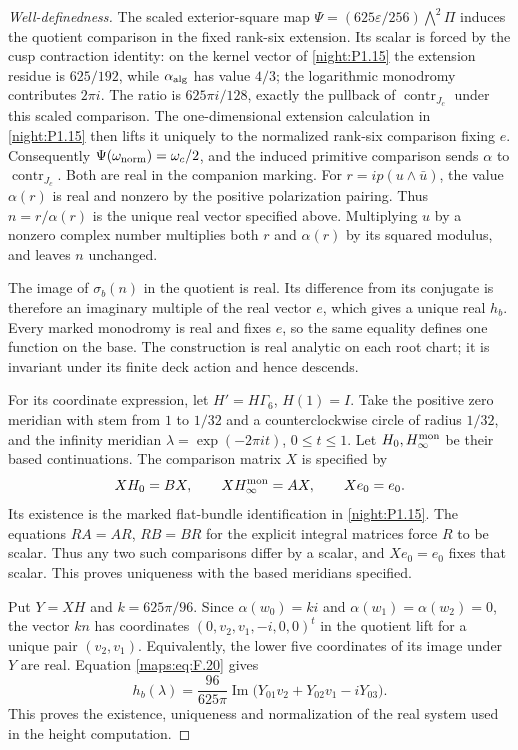 \begin{proof}[Well-definedness]
The scaled exterior-square map
$\Psi=(625\varepsilon/256)\bigwedge^2\Pi$ induces the
quotient comparison in the fixed rank-six extension. Its scalar is forced by the cusp contraction identity: on the
kernel vector of \cref{night:P1.15} the extension residue is
$625/192$, while $\alpha_{\rm alg}$ has value $4/3$; the
logarithmic monodromy contributes $2\pi i$. The ratio is
$625\pi i/128$, exactly the pullback of
$\operatorname{contr}_{J_c}$ under this scaled comparison.
The one-dimensional extension calculation in
\cref{night:P1.15} then lifts it uniquely to the normalized
rank-six comparison fixing $e$.
Consequently $\Psi(\omega_{\rm norm})=\omega_c/2$, and
the induced primitive comparison sends $\alpha$ to
$\operatorname{contr}_{J_c}$. Both are real in the companion
marking. For $r=ip(u\wedge\bar u)$, the value $\alpha(r)$
is real and nonzero by the positive polarization pairing.
Thus $n=r/\alpha(r)$ is the unique real vector specified above.
Multiplying $u$ by a nonzero complex number multiplies both
$r$ and $\alpha(r)$ by its squared modulus, and leaves $n$
unchanged.

The image of $\sigma_b(n)$ in the quotient is real. Its
difference from its conjugate is therefore an imaginary
multiple of the real vector $e$, which gives a unique real
$h_b$. Every marked monodromy is real and fixes $e$, so the
same equality defines one function on the base. The construction
is real analytic on each root chart; it is invariant under its
finite deck action and hence descends.

For its coordinate expression, let $H'=H\Gamma_6$, $H(1)=I$.
Take the positive zero meridian with stem from $1$ to $1/32$
and a counterclockwise circle of radius $1/32$, and the infinity
meridian $\lambda=\exp(-2\pi it)$, $0\le t\le1$.
Let $H_0,H_\infty^{\rm mon}$ be their based continuations.
The comparison matrix $X$ is specified by
\[
 XH_0=BX,\qquad XH_\infty^{\rm mon}=AX,\qquad Xe_0=e_0.
\]
Its existence is the marked flat-bundle identification in
\cref{night:P1.15}. The equations $RA=AR$, $RB=BR$ for the
explicit integral matrices force $R$ to be scalar. Thus any
two such comparisons differ by a scalar, and $Xe_0=e_0$ fixes
that scalar. This proves uniqueness with the based meridians
specified.

Put $Y=XH$ and $k=625\pi/96$. Since
$\alpha(w_0)=ki$ and $\alpha(w_1)=\alpha(w_2)=0$,
the vector $kn$ has coordinates
$(0,v_2,v_1,-i,0,0)^t$ in the quotient lift for a unique
pair $(v_2,v_1)$. Equivalently, the lower five coordinates
of its image under $Y$ are real. Equation
\eqref{maps:eq:F.20} gives
\[
 h_b(\lambda)=\frac{96}{625\pi}
 \operatorname{Im}\bigl(Y_{01}v_2+Y_{02}v_1-iY_{03}\bigr).
\]
This proves the existence, uniqueness and normalization of the
real system used in the height computation.
\end{proof}

